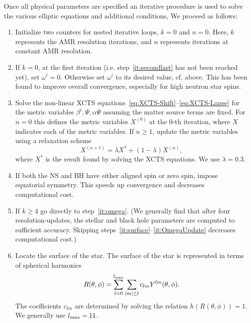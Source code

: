 Once all physical parameters are specified an iterative procedure is
used to solve the various elliptic equations and additional
conditions, We proceed as follows:
\begin{enumerate}
  \renewcommand{\theenumi}{\arabic{enumi}}
\item Initialize two counters for nested iterative loops, $k=0$ and $n=0$. Here, $k$ represents the AMR resolution iterations, and $n$ represents iterations at constant AMR resolution.
  \item
  \label{it:1}
  If $k=0$, 
  at the first iteration (i.e. step~\ref{it:secondlast} has not been
  reached yet), set $\omega^i=0$. Otherwise set $\omega^i$ to its
  desired value, cf. above. This has been found to improve overall
  convergence, especially for high neutron star spins.
\item 
\label{it:solve}
Solve the non-linear XCTS equations~\ref{eq:XCTS-Shift}--\ref{eq:XCTS-Lapse} for the metric variables
  $\beta^i,\Psi,\alpha\Psi$ assuming the matter source
  terms are fixed. For $n=0$ this defines the metric variables $X^{(0)}$ at the 0-th iteration, where $X$ indicates each of the metric variables.
If $n\ge 1$, update the metric variables using a relaxation
  scheme
\begin{equation}
\label{eq:Relaxation}
X^{(n+1)}=\lambda X^{*} + (1-\lambda)X^{(n)},
\end{equation}
where $X^{*}$ is the
result found by solving the XCTS equations. We use $\lambda=0.3$.

\item If both the NS and BH have either aligned spin or zero spin,
  impose equatorial symmetry. This speeds up convergence and
  decreases computational cost.

\item
  \label{it:toplevelparamsolve}

 If $k\ge 4$ go directly to
  step~\ref{it:omega}. (We generally find that after four
  resolution-updates, the stellar and black hole parameters are
  computed to sufficient accuracy. Skipping
  steps~\ref{it:surface}--\ref{it:OmegaUpdate} decreases computational
  cost.)
\item 
\label{it:surface}
Locate the surface of the star. The surface of the star is
  represented in terms of spherical harmonics
\begin{equation}
\label{eq:NSSurf}
R(\theta,\phi)=\sum_{l=0}^{l_{\rm max}}\sum_{|m|\le l} c_{lm}Y^{lm}(\theta,\phi).
\end{equation}
The coefficients $c_{lm}$ are determined by solving the relation $h\left(R\left(\theta,\phi\right)\right)=1$.
We generally use $l_{\rm max}=11$.


\end{enumerate}
